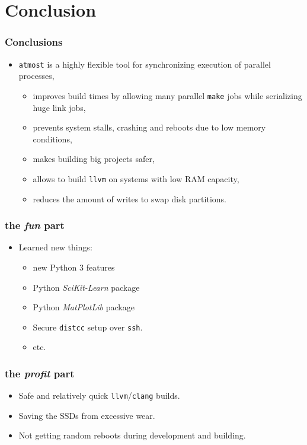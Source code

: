 \documentclass[compress,table,xcolor=table]{beamer}
\newcommand{\shelltext}[1]{\texttt{\colorbox{light-gray}{#1}}}
\begin{document}
\section{Conclusion}
\begin{frame}
  \frametitle{Conclusions}
  \begin{itemize}
    \Large
    \item \shelltext{atmost} is a highly flexible tool for synchronizing
      execution of parallel processes,
    \begin{itemize}
    \large
    \item improves build times by allowing many
      parallel \shelltext{make} jobs while serializing huge link jobs,
    \item prevents system stalls, crashing and reboots due to low memory conditions,
    \item makes building big projects safer,
    \item allows to build \shelltext{llvm} on systems with low RAM capacity,
    \item reduces the amount of writes to swap disk partitions.
    \end{itemize}
  \end{itemize}
\end{frame}
\begin{frame}
  \frametitle{the {\em \Huge fun} part}
  \begin{itemize}
    \LARGE
    \item Learned new things:
    \Large
    \begin{itemize}
      \item new Python 3 features
      \item Python {\em SciKit-Learn} package
      \item Python {\em MatPlotLib} package
      \item Secure \shelltext{distcc} setup over \shelltext{ssh}.
      \item etc.
    \end{itemize}
  \end{itemize}
\end{frame}
\begin{frame}
  \frametitle{the {\em \Huge profit} part}
  \begin{itemize}
    \LARGE
    \item Safe and relatively quick \shelltext{llvm}/\shelltext{clang} builds.
    \item Saving the SSDs from excessive wear.
    \item Not getting random reboots during development and building.
  \end{itemize}
\end{frame}
\end{document}
